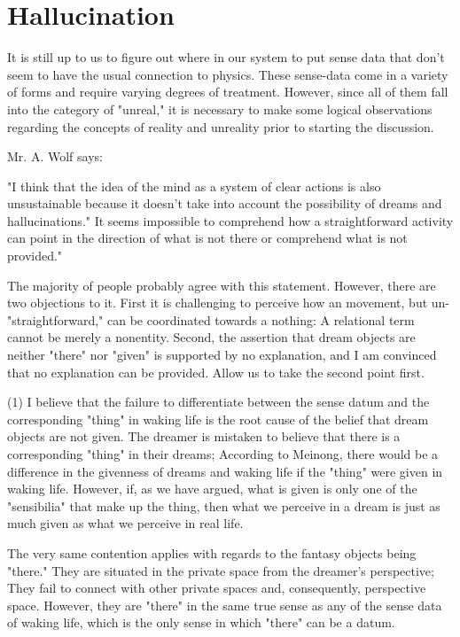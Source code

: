 \documentclass[a4paper,12pt]{book}[2004/02/16]
\theoremstyle{ilemma}
\theoremstyle{itheorem}
\theoremstyle{iother}
\theoremstyle{icorollary}
\theoremstyle{numcorollary}
\theoremstyle{idefinition}
\begin{document}
\section{Hallucination}
It is still up to us to figure out where in our system to put sense data that don't seem to have the usual connection to physics. These sense-data come in a variety of forms and require varying degrees of treatment. However, since all of them fall into the category of "unreal," it is necessary to make some logical observations regarding the concepts of reality and unreality prior to starting the discussion.

Mr. A. Wolf says:

  "I think that the idea of the mind as a system of clear actions is also unsustainable because it doesn't take into account the possibility of dreams and hallucinations." It seems impossible to comprehend how a straightforward activity can point in the direction of what is not there or comprehend what is not provided."

The majority of people probably agree with this statement. However, there are two objections to it. First it is challenging to perceive how an
movement, but un-"straightforward," can be coordinated towards a nothing:
A relational term cannot be merely a nonentity. Second, the assertion that dream objects are neither "there" nor "given" is supported by no explanation, and I am convinced that no explanation can be provided. Allow us to take the
second point first.

(1) I believe that the failure to differentiate between the sense datum and the corresponding "thing" in waking life is the root cause of the belief that dream objects are not given. The dreamer is mistaken to believe that there is a corresponding "thing" in their dreams; According to Meinong, there would be a difference in the givenness of dreams and waking life if the "thing" were given in waking life. However, if, as we have argued, what is given is only one of the "sensibilia" that make up the thing, then what we perceive in a dream is just as much given as what we perceive in real life.

The very same contention applies with regards to the fantasy objects being
"there." They are situated in the private space from the dreamer's perspective; They fail to connect with other private spaces and, consequently, perspective space. However, they are "there" in the same true sense as any of the sense data of waking life, which is the only sense in which "there" can be a datum.
\end{document}
